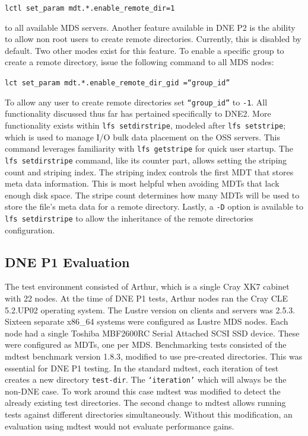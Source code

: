 \documentclass[conference,compsoc]{IEEEtran}
\begin{document}
{\footnotesize{\texttt{lctl set\_param mdt.*.enable\_remote\_dir=1}}}

to all available MDS servers. Another feature available in DNE P2 is the
ability to allow non root users to create remote directories. Currently, this
is disabled by default. Two other modes exist for this feature. To enable a
specific group to create a remote directory, issue the following command
to all MDS nodes:

{\footnotesize{\texttt{{lct set\_param mdt.*.enable\_remote\_dir\_gid
=``group\_id''}}}} 

To allow any user to create remote directories set {\footnotesize{\texttt{``group\_id''}}} 
to {\footnotesize{\texttt{-1}}}. All functionality discussed thus far has pertained
specifically to DNE2. More functionality exists within {\footnotesize{\texttt{lfs setdirstripe}}},
modeled after {\footnotesize{\texttt{lfs setstripe}}}; which is used to manage I/O bulk data
placement on the OSS servers. This command leverages familiarity with
{\footnotesize{\texttt{lfs getstripe}}} for quick user startup. The 
{\footnotesize{\texttt{{lfs setdirstripe}}}}  command, like its counter part, allows
setting the striping count and striping index. The striping index controls the first
MDT that stores meta data information. This is most helpful when avoiding MDTs
that lack enough disk space. The stripe count determines how many MDTs
will be used to store the file's meta data for a remote directory. Lastly,
a {\footnotesize{\texttt{{-D}}}} option is available to {\footnotesize{\texttt{{lfs setdirstripe}}}} to allow the inheritance of the
remote directories configuration.


\subsection{DNE P1 Evaluation}

The test environment consisted of Arthur, which is a single Cray XK7 cabinet with
22 nodes. At the time of DNE P1 tests, Arthur nodes ran the Cray CLE 5.2.UP02
operating system. The Lustre version on clients and servers was 2.5.3. Sixteen separate x86\_64
systems were configured as Lustre MDS nodes. 
Each node had a single Toshiba MBF2600RC Serial Attached SCSI
SSD device. These were configured as MDTs, one per MDS.  Benchmarking tests
consisted of the mdtest benchmark version 1.8.3, modified to use pre-created
directories. This was essential for DNE P1 testing. 
In the standard mdtest, each iteration of test creates a new
directory {\footnotesize{\texttt{test-dir}}}. The
{\footnotesize{\texttt{`iteration'}}} which will always be the non-DNE case. To
work around this case mdtest was modified to detect the already existing
test directories. The second change to mdtest allows running tests against
different directories simultaneously. Without this modification, an evaluation
using mdtest would not evaluate performance gains.
\end{document}
